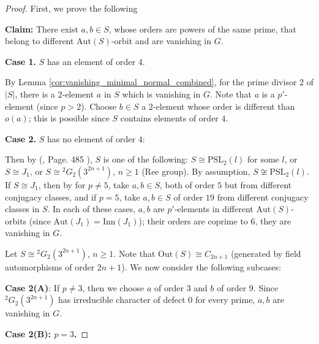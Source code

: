 \documentclass[11pt, a4paper]{article}
\numberwithin{equation}{section}
\theoremstyle{plain} %
\begin{document}
\begin{proof} First, we prove the following 

\noindent\textbf{Claim:} There exist $a,b\in S$, whose orders are powers of the same prime, that belong to different $\mathrm{Aut}(S)$-orbit and are vanishing in $G$.


\vskip5mm\noindent
\textbf{Case 1.} $S$ has an element of order $4$.

 By Lemma \ref{cor:vanishing_minimal_normal_combined},  for the prime divisor $2$ of $|S|$, there is a $2$-element $a$ in $S$ which is vanishing in $G$. Note that $a$ is a $p'$-element (since $p>2$). Choose $b\in S$ a $2$-element whose order is different than $o(a)$; this is possible since $S$ contains elements of order $4$. 


\vskip5mm\noindent
\textbf{Case 2.} $S$ has no element of order $4$:

Then by (\cite{MR569209}, Page. 485 ), $S$ is one of the following: $S \cong \mathrm{PSL}_2(l) $ for some $l$, or  $S\cong J_1$, or $S\cong { }^2G_2(3^{2n+1})$, $n\ge 1$ (Ree  group). By assumption, $S\not\cong \mathrm{PSL}_2(l)$. 
If $S\cong J_1$, then by \cite{MR827219} for $p\neq 5$, take $a,b\in S$, both of order $5$ but from different conjugacy classes, and if $p=5$, take $a,b\in S$ of order $19$ from different conjugacy classes in $S$. In each of these cases, $a,b$ are $p'$-elements in different $\mathrm{Aut}(S)$-orbits (since $\mathrm{Aut}(J_1)=\mathrm{Inn}(J_1)$); their orders are coprime to $6$, they are vanishing in $G$. 

Let $S\cong {^2G_2}(3^{2n+1})$, $n\geq 1$. Note that $\mathrm{Out}(S)\cong C_{2n+1}$ (generated by field automorphisms of order $2n+1$). We now consider the following subcases:

\textbf{Case 2(A)}: If $p\neq 3$, then we choose $a$ of order $3$ and $b$ of order $9$. Since ${}^2G_2(3^{2n+1})$ has irreducible character of defect $0$ for every prime, $a,b$ are vanishing in $G$. 




\vskip5mm
\textbf{Case 2(B): $p=3$.}



\end{proof}
\end{document}
